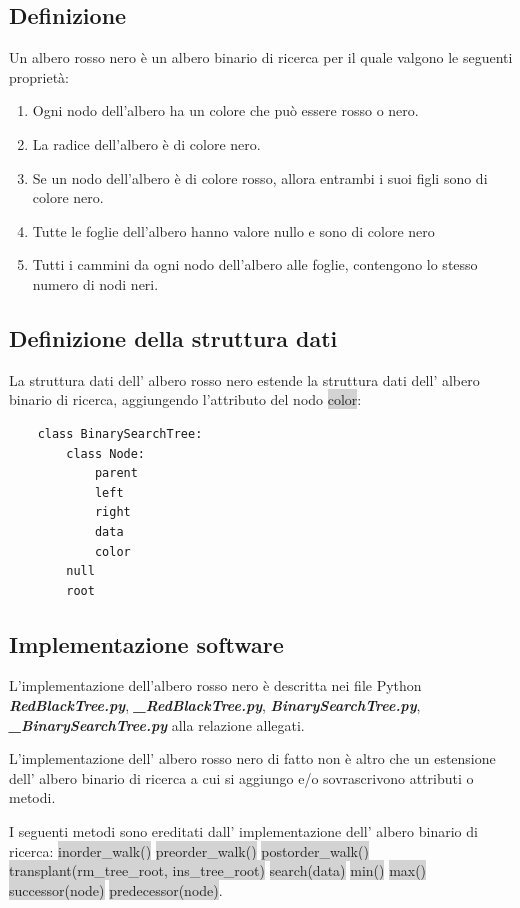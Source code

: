 \documentclass{article}
\begin{document}
		\subsection{Definizione}
		
			Un albero rosso nero è un albero binario di ricerca per il quale valgono le seguenti proprietà:

			\begin{enumerate}
				\item Ogni nodo dell'albero ha un colore che può essere rosso o nero.
				\item La radice dell'albero è di colore nero.
				\item Se un nodo dell'albero è di colore rosso, allora entrambi i suoi figli sono di colore nero.
				\item Tutte le foglie dell'albero hanno valore nullo e sono di colore nero
				\item Tutti i cammini da ogni nodo dell'albero alle foglie, contengono lo stesso numero di nodi neri.
			\end{enumerate}
		
		\subsection{Definizione della struttura dati}
			La struttura dati dell' albero rosso nero estende la struttura dati dell' albero binario di ricerca, aggiungendo l'attributo del nodo  \colorbox{lightgray}{color}:
			\begin{lstlisting}
	class BinarySearchTree:
		class Node:
			parent
			left
			right
			data
			color
		null
		root
			\end{lstlisting}
		
		\subsection{Implementazione software}
			L'implementazione dell'albero rosso nero è descritta nei file Python \textbf{\textit{RedBlackTree.py}}, \textbf{\textit{\_RedBlackTree.py}}, \textbf{\textit{BinarySearchTree.py}}, \textbf{\textit{\_BinarySearchTree.py}} alla relazione allegati.
			
			L'implementazione dell' albero rosso nero di fatto non è altro che un estensione dell' albero binario di ricerca a cui si aggiungo e/o sovrascrivono attributi o metodi.
			
			I seguenti metodi sono ereditati dall' implementazione dell' albero binario di ricerca:
			\newline
			\colorbox{lightgray}{inorder\_walk()} \colorbox{lightgray}{preorder\_walk()} \colorbox{lightgray}{postorder\_walk()} \colorbox{lightgray}{transplant(rm\_tree\_root, ins\_tree\_root)} \colorbox{lightgray}{search(data)} \colorbox{lightgray}{min()} \colorbox{lightgray}{max()} \colorbox{lightgray}{successor(node)} \colorbox{lightgray}{predecessor(node)}.
			
\end{document}

